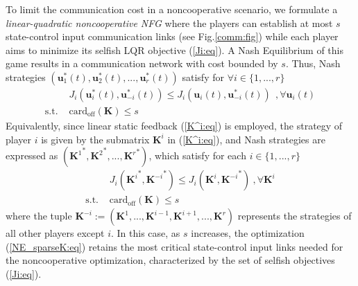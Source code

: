 \documentclass[12pt, draftclsnofoot,onecolumn]{IEEEtran}
\begin{document}
To limit the communication cost in a noncooperative scenario, we formulate a {\it linear-quadratic noncooperative NFG} where the players can establish at most $s$ state-control input communication links (see Fig.\ref{comm:fig}) while each player aims to minimize its selfish LQR objective (\ref{Ji:eq}). A Nash Equilibrium of this game results in a communication network with cost bounded by $s$. Thus, Nash strategies $({\boldsymbol u}_1^*(t), {\boldsymbol u}_2^*(t),..., {\boldsymbol u}_r^*(t))$ satisfy for $\forall i\in\{1,...,r\}$
\begin{align}
&J_i(\boldsymbol{u}_i^*(t), \boldsymbol{u}_{-i}^*(t)) \leq J_i(\boldsymbol{u}_i(t), \boldsymbol{u}_{-i}^*(t))~~,\forall {\boldsymbol u}_i(t) \nonumber\\
\mbox{s.t. } & \mathrm{card}_{\mathrm{off}}({\boldsymbol K}) \leq s 
\label{sparse_NE:eq}
\end{align}
\noindent Equivalently, since linear static feedback (\ref{K^i:eq}) is employed, the strategy of player $i$ is given by the submatrix ${\boldsymbol K}^i$ in (\ref{K^i:eq}), and Nash strategies are expressed as $({{\boldsymbol K}^1}^*,{{\boldsymbol K}^2}^*,...,{{\boldsymbol K}^r}^*)$, which satisfy for each $i\in\{1,...,r\}$
\begin{align}
&J_i({{\boldsymbol K}^{i}}^*,{{\boldsymbol K}^{-i}}^*) \leq J_i({\boldsymbol K}^{i},{{\boldsymbol K}^{-i}}^*) ~,\forall {\boldsymbol K}^{i}\nonumber\\
\mbox{s.t. } & \mathrm{card}_{\mathrm{off}}({\boldsymbol K}) \leq s 
\label{NE_sparseK:eq}
\end{align}
\noindent where the tuple ${\boldsymbol K}^{-i}:= ({\boldsymbol K}^{1},...,{\boldsymbol K}^{i-1}\allowbreak,\allowbreak {\boldsymbol K}^{i+1}\allowbreak,\allowbreak...,{\boldsymbol K}^{r})$ represents the strategies of all other players except $i$. In this case, as $s$ increases, the optimization (\ref{NE_sparseK:eq}) retains the most critical state-control input links needed for the noncooperative optimization, characterized by the set of selfish objectives (\ref{Ji:eq}).
\end{document}
